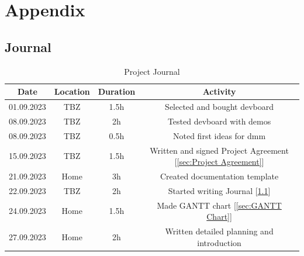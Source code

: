 \chapter{Appendix}
\label{cha:Appendix}

\section{Journal}
\label{sec:Journal}
\begin{table}[H]
    \centering
    \label{tab:Project Journal}
\begin{tabular}{||c | c | c || c||} 
 \hline
 Date &  Location & Duration & Activity \\ [0.5ex] 
 \hline\hline
  01.09.2023 & TBZ & 1.5h & Selected and bought \acs{devboard} \\ 
 \hline
 08.09.2023 & TBZ & 2h & Tested \acs{devboard} with demos \\ 
 \hline
  08.09.2023 & TBZ & 0.5h & Noted first ideas for \acs{dmm} \\ 
 \hline
   15.09.2023 & TBZ & 1.5h & Written and signed Project Agreement [\ref{sec:Project Agreement}] \\ 
 \hline
    21.09.2023 & Home & 3h & Created documentation template \\ 
 \hline
    22.09.2023 & TBZ & 2h &  Started writing Journal [\ref{sec:Journal}]\\ 
 \hline
    24.09.2023 & Home & 1.5h &  Made GANTT chart [\ref{sec:GANTT Chart}]\\ 
 \hline
    27.09.2023 & Home & 2h & Written detailed planning and introduction \\ 
 \hline
\end{tabular}
    \caption{Project Journal}
\end{table}
\newpage

